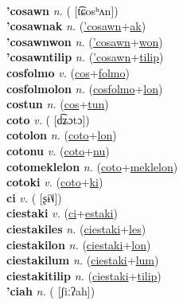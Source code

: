 \label{cos} \\
\textbf{'cosawn} \textit{n.} ( [t͡ɕosʰʌn])
 \label{'cosawn} \\
\textbf{'cosawnak} \textit{n.} (\hyperref['cosawn]{'cosawn}+\hyperref[ak]{ak})
 \label{'cosawnak} \\
\textbf{'cosawnwon} \textit{n.} (\hyperref['cosawn]{'cosawn}+\hyperref[won]{won})
 \label{'cosawnwon} \\
\textbf{'cosawntilip} \textit{n.} (\hyperref['cosawn]{'cosawn}+\hyperref[tilip]{tilip})
 \label{'cosawntilip} \\
\textbf{cosfolmo} \textit{v.} (\hyperref[cos]{cos}+\hyperref[folmo]{folmo})
 \label{cosfolmo} \\
\textbf{cosfolmolon} \textit{n.} (\hyperref[cosfolmo]{cosfolmo}+\hyperref[lon]{lon})
 \label{cosfolmolon} \\
\textbf{costun} \textit{n.} (\hyperref[cos]{cos}+\hyperref[tun]{tun})
 \label{costun} \\
\textbf{coto} \textit{v.} ( [d͡ʑɔtɔ])
 \label{coto} \\
\textbf{cotolon} \textit{n.} (\hyperref[coto]{coto}+\hyperref[lon]{lon})
 \label{cotolon} \\
\textbf{cotonu} \textit{v.} (\hyperref[coto]{coto}+\hyperref[nu]{nu})
 \label{cotonu} \\
\textbf{cotomeklelon} \textit{n.} (\hyperref[coto]{coto}+\hyperref[meklelon]{meklelon})
 \label{cotomeklelon} \\
\textbf{cotoki} \textit{v.} (\hyperref[coto]{coto}+\hyperref[ki]{ki})
 \label{cotoki} \\
\textbf{ci} \textit{v.} ( [ʂɨ˥˩])
 \label{ci} \\
\textbf{ciestaki} \textit{v.} (\hyperref[ci]{ci}+\hyperref[estaki]{estaki})
 \label{ciestaki} \\
\textbf{ciestakiles} \textit{n.} (\hyperref[ciestaki]{ciestaki}+\hyperref[les]{les})
 \label{ciestakiles} \\
\textbf{ciestakilon} \textit{n.} (\hyperref[ciestaki]{ciestaki}+\hyperref[lon]{lon})
 \label{ciestakilon} \\
\textbf{ciestakilum} \textit{n.} (\hyperref[ciestaki]{ciestaki}+\hyperref[lum]{lum})
 \label{ciestakilum} \\
\textbf{ciestakitilip} \textit{n.} (\hyperref[ciestaki]{ciestaki}+\hyperref[tilip]{tilip})
 \label{ciestakitilip} \\
\textbf{'ciah} \textit{n.} ( [ʃiːʔah])
 \label{'ciah} \\
